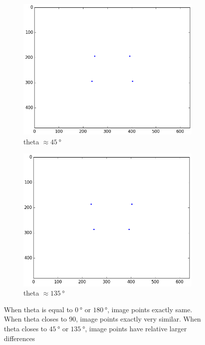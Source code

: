 \begin{figure}[H]
    \begin{subfigure}[b]{0.4\textwidth}
    \includegraphics[width=\textwidth]{./fig/5.png}
    \caption{theta $\approx \SI{45}{\degree}$}
  \end{subfigure}
  \begin{subfigure}[b]{0.4\textwidth}
    \includegraphics[width=\textwidth]{./fig/15.png}
    \caption{theta $\approx \SI{135}{\degree}$}
  \end{subfigure}
  \caption{When theta is equal to $\SI{0}{\degree}$ or $\SI{180}{\degree}$, image points exactly same. When theta closes to 90, image points exactly very similar. When theta closes to $\SI{45}{\degree}$ or $\SI{135}{\degree}$, image points have relative larger differences}
  \label{fig:119}
\end{figure}

